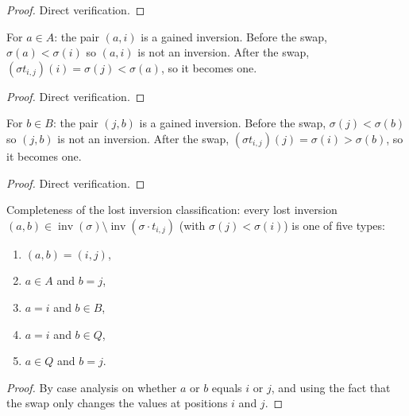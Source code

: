 \begin{proof}
\leanok
Direct verification.
\end{proof}

\begin{lemma}
\label{lem.perm.ai_gained_for_a_in_A}
\leanhelper
\leanok
For $a \in A$: the pair $(a, i)$ is a gained inversion.
Before the swap, $\sigma(a) < \sigma(i)$ so $(a,i)$ is not an inversion.
After the swap, $(\sigma t_{i,j})(i) = \sigma(j) < \sigma(a)$, so it becomes one.
\end{lemma}

\begin{proof}
\leanok
Direct verification.
\end{proof}

\begin{lemma}
\label{lem.perm.jb_gained_for_b_in_B}
\leanhelper
\leanok
For $b \in B$: the pair $(j, b)$ is a gained inversion.
Before the swap, $\sigma(j) < \sigma(b)$ so $(j,b)$ is not an inversion.
After the swap, $(\sigma t_{i,j})(j) = \sigma(i) > \sigma(b)$, so it becomes one.
\end{lemma}

\begin{proof}
\leanok
Direct verification.
\end{proof}

\begin{lemma}
\label{lem.perm.lost_inversion_complete}
\leanhelper
\leanok
Completeness of the lost inversion classification:
every lost inversion $(a,b) \in \operatorname{inv}(\sigma) \setminus \operatorname{inv}(\sigma \cdot t_{i,j})$
(with $\sigma(j) < \sigma(i)$) is one of five types:
\begin{enumerate}
\item $(a,b) = (i,j)$,
\item $a \in A$ and $b = j$,
\item $a = i$ and $b \in B$,
\item $a = i$ and $b \in Q$,
\item $a \in Q$ and $b = j$.
\end{enumerate}
\end{lemma}

\begin{proof}
\leanok
By case analysis on whether $a$ or $b$ equals $i$ or $j$,
and using the fact that the swap only changes the values at positions $i$ and $j$.
\end{proof}

